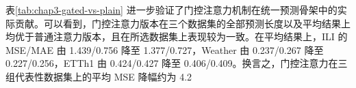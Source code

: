 \begin{table}[H]
\end{table} 表\ref{tab:chap3-gated-vs-plain} 进一步验证了门控注意力机制在统一预测骨架中的实际贡献。可以看到，门控注意力版本在三个数据集的全部预测长度以及平均结果上均优于普通注意力版本，且在所选数据集上表现较为一致。在平均结果上，ILI 的 MSE/MAE 由 1.439/0.756 降至 1.377/0.727，Weather 由 0.237/0.267 降至 0.227/0.256，ETTh1 由 0.424/0.427 降至 0.406/0.409。换言之，门控注意力在三组代表性数据集上的平均 MSE 降幅约为 4.2%








